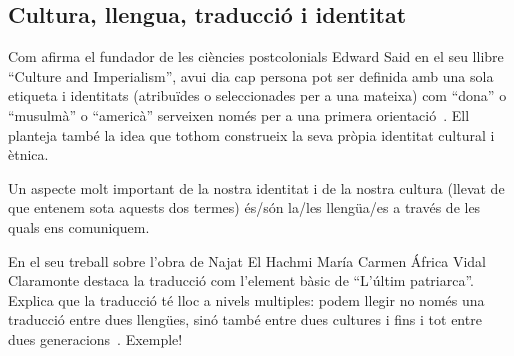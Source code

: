 \subsection{Cultura, llengua, traducció i identitat}
Com afirma el fundador de les ciències postcolonials Edward Said en el seu llibre ``Culture and Imperialism'', avui dia cap persona pot ser definida amb una sola etiqueta
i identitats (atribuïdes o seleccionades per a una mateixa) com ``dona'' o ``musulmà'' o ``americà'' serveixen només per a una primera orientació~\autocite{Vidal2012}.
Ell planteja també la idea que tothom construeix la seva pròpia identitat cultural i ètnica.



Un aspecte molt important de la nostra identitat i de la nostra cultura (llevat de que entenem sota aquests dos termes) és/són la/les llengüa/es a través de les quals ens comuniquem.


En el seu treball sobre l'obra de Najat El Hachmi María Carmen África Vidal Claramonte destaca la traducció com l'element bàsic de ``L'últim patriarca''.
Explica que la traducció té lloc a nivels multiples: podem llegir no només una traducció entre dues llengües, sinó també entre dues cultures i fins i tot entre dues generacions~\autocite{Vidal2012}.
Exemple!

